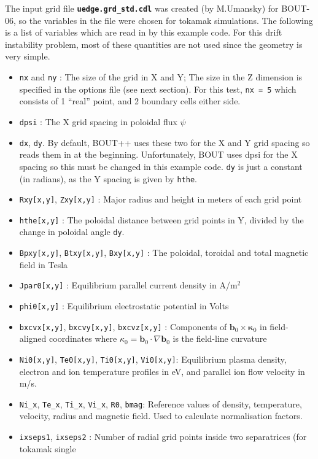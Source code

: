 \documentclass[12pt]{article}
\newcommand{\code}[1]{\texttt{#1}}
\newcommand{\file}[1]{\texttt{\bf #1}}
\newcommand{\Vec}[1]{\ensuremath{\mathbf{#1}}}
\newcommand{\bvec}{\Vec{b}}
\newcommand{\kvec}{\Vec{\kappa}}
\begin{document}
The input grid file \file{uedge.grd\_std.cdl} was created (by M.Umansky) for
BOUT-06, so the variables in the file were chosen for tokamak simulations. 
The following is a list of variables which are read in by this example code. For this drift instability
problem, most of these quantities are not used since the geometry is very simple.
\begin{itemize}
\item \code{nx} and \code{ny} : The size of the grid in X and Y; The size in the Z dimension is specified in the
options file (see next section). For this test, \code{nx = 5} which consists of 1 ``real'' point, and 2 boundary
cells either side.
\item \code{dpsi} : The X grid spacing in poloidal flux $\psi$
\item \code{dx}, \code{dy}. By default, BOUT++ uses these two for the X and Y grid spacing so reads them in
  at the beginning. Unfortunately, BOUT uses dpsi for the X spacing so this must be changed in this example code.
  \code{dy} is just a constant (in radians), as the Y spacing is given by \code{hthe}.
\item \code{Rxy[x,y]}, \code{Zxy[x,y]} : Major radius and height in meters of each grid point
\item \code{hthe[x,y]} : The poloidal distance between grid points in Y, divided by the change in poloidal angle
  \code{dy}.
\item \code{Bpxy[x,y]}, \code{Btxy[x,y]}, \code{Bxy[x,y]} : The poloidal, toroidal and total magnetic field in Tesla
\item \code{Jpar0[x,y]} : Equilibrium parallel current density in A/m$^2$
\item \code{phi0[x,y]} : Equilibrium electrostatic potential in Volts
\item \code{bxcvx[x,y]}, \code{bxcvy[x,y]}, \code{bxcvz[x,y]} : Components of $\bvec_0\times\kvec_0$ in field-aligned coordinates
  where $\kappa_0 = \bvec_0\cdot\nabla\bvec_0$ is the field-line curvature
\item \code{Ni0[x,y]}, \code{Te0[x,y]}, \code{Ti0[x,y]}, \code{Vi0[x,y]}: Equilibrium plasma density, electron and ion temperature
  profiles in eV, and parallel ion flow velocity in m/s.
\item \code{Ni\_x}, \code{Te\_x}, \code{Ti\_x}, \code{Vi\_x}, \code{R0}, \code{bmag}: Reference values of density,
  temperature, velocity, radius and magnetic field. Used to calculate normalisation factors.
\item \code{ixseps1}, \code{ixseps2} : Number of radial grid points inside two separatrices (for tokamak single

\end{itemize}
\end{document}
